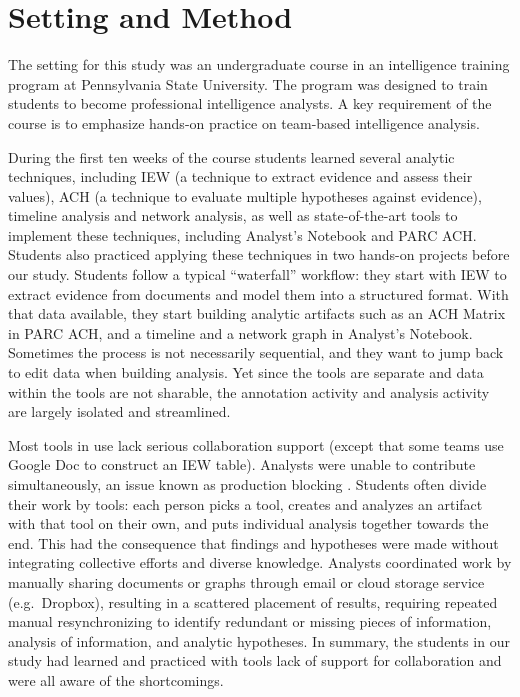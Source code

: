 \section{Setting and Method}\label{classroom-study-settings}

The setting for this study was an undergraduate course in an intelligence
training program at Pennsylvania State University. The program was designed to train students
to become professional intelligence analysts. A key requirement of the course is
to emphasize hands-on practice on team-based intelligence analysis.


 During the first ten weeks of the course
 students learned several analytic techniques, including IEW (a technique
 to extract evidence and assess their values), ACH (a technique to evaluate
 multiple hypotheses against evidence), timeline analysis and network
 analysis, as well as state-of-the-art tools to implement these
 techniques, including Analyst's Notebook and PARC ACH. Students also practiced applying these
 techniques in two hands-on projects before our study. Students follow a typical ``waterfall'' workflow: they start with IEW to
 extract evidence from documents and model them into a structured format. With that data available, they start building analytic
 artifacts such as an ACH Matrix in PARC ACH, and a timeline and a network
 graph in Analyst's Notebook. Sometimes the process is not necessarily sequential, and they want to jump back to edit data when building analysis. Yet since the tools are separate and data within the tools are not sharable, the annotation activity and analysis activity are largely isolated and streamlined. 
 
 Most tools in use lack serious collaboration
 support (except that some teams use Google Doc to construct an IEW
 table). Analysts were unable to contribute simultaneously, an issue
 known as production blocking \citep{Diehl1987a}. Students often divide their work by tools: each person picks a tool, creates and analyzes an artifact
 with that tool on their own, and puts individual analysis together towards the end. This had the consequence that findings and
 hypotheses were made without integrating collective efforts and diverse
 knowledge. Analysts coordinated work by manually sharing documents
 or graphs through email or cloud storage service (e.g.~Dropbox),
 resulting in a scattered placement of results, requiring repeated manual
 resynchronizing to identify redundant or missing pieces of information,
 analysis of information, and analytic hypotheses. In summary, the students in our study had learned and practiced with tools lack of support for collaboration and were all aware of the shortcomings.

